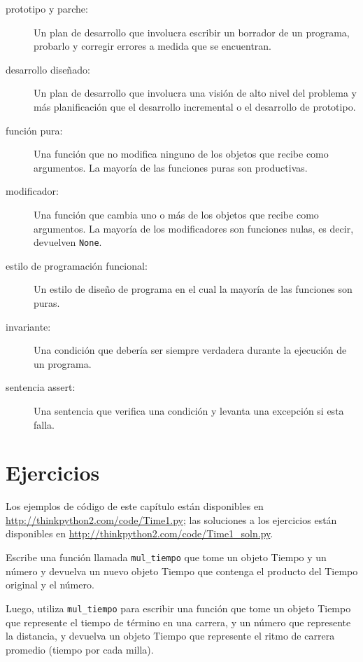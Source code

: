 \documentclass[10pt]{book}
\begin{document}
\begin{description}

\item[prototipo y parche:] Un plan de desarrollo que involucra
escribir un borrador de un programa, probarlo y corregir errores a medida que
se encuentran.

\item[desarrollo diseñado:] Un plan de desarrollo que involucra una
visión de alto nivel del problema y más planificación que el desarrollo
incremental o el desarrollo de prototipo.

\item[función pura:] Una función que no modifica ninguno de los objetos que
recibe como argumentos.  La mayoría de las funciones puras son productivas.

\item[modificador:] Una función que cambia uno o más de los objetos que
  recibe como argumentos.  La mayoría de los modificadores son funciones nulas, es decir,
  devuelven {\tt None}.

\item[estilo de programación funcional:] Un estilo de diseño de programa en el cual la
mayoría de las funciones son puras.

\item[invariante:] Una condición que debería ser siempre verdadera durante la
ejecución de un programa.

\item[sentencia assert:] Una sentencia que verifica una condición y levanta
una excepción si esta falla.

\end{description}


\section{Ejercicios}

Los ejemplos de código de este capítulo están disponibles en
\url{http://thinkpython2.com/code/Time1.py}; las soluciones a los
ejercicios están disponibles en \url{http://thinkpython2.com/code/Time1_soln.py}.

\begin{exercise}

Escribe una función llamada \verb"mul_tiempo" que tome un objeto Tiempo
y un número y devuelva un nuevo objeto Tiempo que contenga
el producto del Tiempo original y el número.

Luego, utiliza \verb"mul_tiempo" para escribir una función que tome un objeto
Tiempo que represente el tiempo de término en una carrera, y un número
que represente la distancia, y devuelva un objeto Tiempo que represente
el ritmo de carrera promedio (tiempo por cada milla).

\end{exercise}
\end{document}
